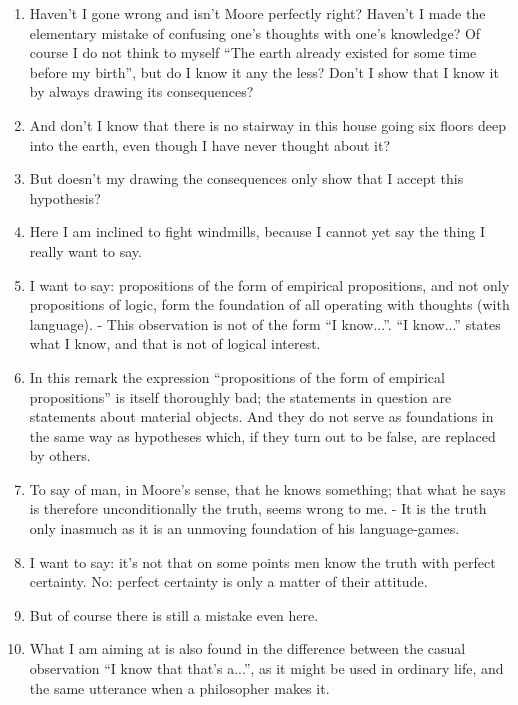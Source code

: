 \documentclass{book}
\begin{document}
\begin{enumerate}
\item
Haven't I gone wrong and isn't Moore perfectly right? Haven't I made the
elementary mistake of confusing one's thoughts with one's knowledge? Of course
I do not think to myself ``The earth already existed for some time before my
birth'', but do I know it any the less? Don't I show that I know it by always
drawing its consequences?

\item
And don't I know that there is no stairway in this house going six floors deep
into the earth, even though I have never thought about it?

\item
But doesn't my drawing the consequences only show that I accept this
hypothesis?

\item
Here I am inclined to fight windmills, because I cannot yet say the thing I
really want to say.

\item
I want to say: propositions of the form of empirical propositions, and not only
propositions of logic, form the foundation of all operating with thoughts (with
language). - This observation is not of the form ``I know...''. ``I know...''
states what I know, and that is not of logical interest.

\item
In this remark the expression ``propositions of the form of empirical
propositions'' is itself thoroughly bad; the statements in question are
statements about material objects. And they do not serve as foundations in the
same way as hypotheses which, if they turn out to be false, are replaced by
others.

\item
To say of man, in Moore's sense, that he knows something; that what he says is
therefore unconditionally the truth, seems wrong to me. - It is the truth only
inasmuch as it is an unmoving foundation of his language-games.

\item
I want to say: it's not that on some points men know the truth with perfect
certainty. No: perfect certainty is only a matter of their attitude.

\item
But of course there is still a mistake even here.

\item
What I am aiming at is also found in the difference between the casual
observation ``I know that that's a...'', as it might be used in ordinary life,
and the same utterance when a philosopher makes it.


\end{enumerate}
\end{document}
